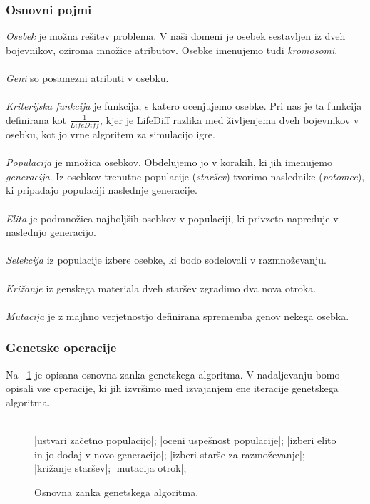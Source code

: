 \documentclass[12pt,a4paper,openany]{book}
\begin{document}
\subsubsection{Osnovni pojmi}
\textit{Osebek} je možna rešitev problema. V naši domeni je osebek sestavljen iz dveh bojevnikov, oziroma množice atributov. Osebke imenujemo tudi \textit{kromosomi}.
\\\\
\textit{Geni} so posamezni atributi v osebku.
\\\\
\textit{Kriterijska funkcija} je funkcija, s katero ocenjujemo osebke. Pri nas je ta funkcija definirana kot $\frac{1}{LifeDiff}$, kjer je LifeDiff razlika med življenjema dveh bojevnikov v osebku, kot jo vrne algoritem za simulacijo igre.
\\\\
\textit{Populacija} je množica osebkov. Obdelujemo jo v korakih, ki jih imenujemo \textit{generacija}. Iz osebkov trenutne populacije (\textit{staršev}) tvorimo naslednike (\textit{potomce}), ki pripadajo populaciji naslednje generacije.
\\\\
\textit{Elita} je podmnožica najboljših osebkov v populaciji, ki privzeto napreduje v naslednjo generacijo.
\\\\
\textit{Selekcija} iz populacije izbere osebke, ki bodo sodelovali v razmnoževanju.
\\\\
\textit{Križanje} iz genskega materiala dveh staršev zgradimo dva nova otroka.
\\\\
\textit{Mutacija} je z majhno verjetnostjo definirana sprememba genov nekega osebka.

\subsubsection{Genetske operacije}

Na ~\ref{fig:genetski} je opisana osnovna zanka genetskega algoritma. V nadaljevanju bomo opisali vse operacije, ki jih izvršimo med izvajanjem ene iteracije genetskega algoritma.
\\\\
\begin{figure}[ht]
 \begin{program}
\BEGIN
|ustvari začetno populacijo|;
   \DO
     |oceni uspešnost populacije|;
     |izberi elito in jo dodaj v novo generacijo|;
     |izberi starše za razmoževanje|;
     |križanje staršev|;
     |mutacija otrok|;
  \END
\END
\end{program}
 \caption[Genetski algoritem]{Osnovna zanka genetskega algoritma.}
 \label{fig:genetski}
\end{figure}
\end{document}
